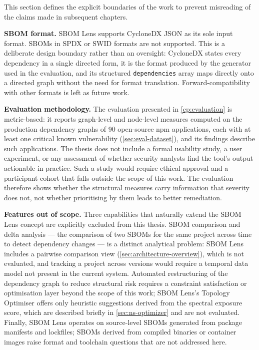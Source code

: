This section defines the explicit boundaries of the work to prevent misreading of the claims made in subsequent chapters.

\textbf{SBOM format.} SBOM Lens supports CycloneDX JSON as its sole input format. SBOMs in SPDX or SWID formats are not supported. This is a deliberate design boundary rather than an oversight: CycloneDX states every dependency in a single directed form, it is the format produced by the generator used in the evaluation, and its structured \texttt{dependencies} array maps directly onto a directed graph without the need for format translation. Forward-compatibility with other formats is left as future work.

\textbf{Evaluation methodology.} The evaluation presented in \autoref{cp:evaluation} is metric-based: it reports graph-level and node-level measures computed on the production dependency graphs of 90 open-source npm applications, each with at least one critical known vulnerability (\autoref{sec:eval-dataset}), and its findings describe such applications. The thesis does not include a formal usability study, a user experiment, or any assessment of whether security analysts find the tool's output actionable in practice. Such a study would require ethical approval and a participant cohort that falls outside the scope of this work. The evaluation therefore shows whether the structural measures carry information that severity does not, not whether prioritising by them leads to better remediation.

\textbf{Features out of scope.} Three capabilities that naturally extend the SBOM Lens concept are explicitly excluded from this thesis. SBOM comparison and delta analysis --- the comparison of two SBOMs for the same project across time to detect dependency changes --- is a distinct analytical problem: SBOM Lens includes a pairwise comparison view (\autoref{sec:architecture-overview}), which is not evaluated, and tracking a project across versions would require a temporal data model not present in the current system. Automated restructuring of the dependency graph to reduce structural risk requires a constraint satisfaction or optimisation layer beyond the scope of this work; SBOM Lens's Topology Optimiser offers only heuristic suggestions derived from the spectral exposure score, which are described briefly in \autoref{sec:ns-optimizer} and are not evaluated. Finally, SBOM Lens operates on source-level SBOMs generated from package manifests and lockfiles; SBOMs derived from compiled binaries or container images raise format and toolchain questions that are not addressed here.

